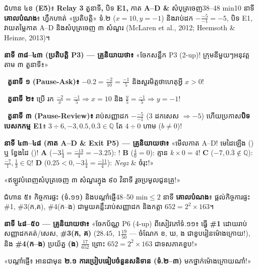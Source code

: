 \documentclass[a4paper,12pt]{article}
\newcommand{\en}[1]{{\TimesEn #1}}
\newcommand{\enbf}[1]{{\TimesEn\textbf{#1}}}
\newcommand{\enit}[1]{{\TimesEn\textit{#1}}}
\newcommand{\cnum}[1]{\mbox{\TimesEn\fontsize{10.5pt}{12pt}\selectfont\ding{\numexpr181+#1\relax}}\hspace{0.15em}}
\begin{document}
\begin{phasebox}{ជំហាន ៤ខ \enbf{(E5)}៖ \enbf{Relay 3} តួនាទី\enbf{,} បិទ \enbf{E1,} កាត \enbf{A–D \&} សំបុត្រចេញ}{38–48 min}{10 នាទី}
\textbf{គោលបំណង}៖ ហ្វឹកហាត់ «ប្រតិបត្តិ» ទំ.២ ($x=10, y=-1$) និងរាប់ដក $-\frac{-5}{-1}=-5$, បិទ \en{E1}, វាយតម្លៃកាត \en{A–D} និងសំបុត្រចេញ ៣ សំណួរ \en{(McLaren et al., 2012; Heemsoth \& Heinze, 2013)}។
\end{phasebox}
\begin{scriptbox}
  \textbf{នាទី ៣៨–៤៣ (ប្រតិបត្តិ \en{P3}) — គ្រូនិយាយថា៖} «ចែកសន្លឹក \en{P3 (2-up)}! ក្រុមនីមួយៗអនុវត្តតាម ៣ តួនាទី៖»\par\vspace{2pt}
  \textbullet\ \textbf{តួនាទី ១ (\en{Pause-Ask})៖} \en{[tracing]} $-0.2=\frac{-2}{10}=\frac{-1}{5}$ និងសួរមិត្តថាហេតុអ្វី $x > 0$!\par\vspace{2pt}
  \textbullet\ \textbf{តួនាទី ២៖} ប្រើ \cnum{4} រក $\frac{-2}{x}=\frac{-1}{5}\Rightarrow x=10$ និង $\frac{y}{5}=\frac{-1}{5}\Rightarrow y=-1$!\par\vspace{2pt}
  \textbullet\ \textbf{តួនាទី ៣ (\en{Pause-Review})៖} រាប់សញ្ញាដក $-\frac{-5}{-1}$ ($3$ ដកសេស $\Rightarrow -5$) ហើយប្រកាស\textbf{បិទបេសកកម្ម \en{E1}}៖ $3\div 6, -3, 0.5, 0.\overline{3} \in \mathbb{Q}$ តែ $4\div 0$ ហាម ($b\neq 0$)!\par\vspace{2pt}
  \textbf{នាទី ៤៣–៤៨ (កាត \en{A–D} \& \en{Exit P5}) — គ្រូនិយាយថា៖} «មើលកាត \en{A–D}! មេដៃឡើង () ឬ ខ្វែងដៃ ()! \textbf{A} ($-3\frac{1}{4}=\frac{-13}{4}=-3.25$): ! \textbf{B} ($\frac{4}{0}=0$):  គ្មាន $k\times 0=4$! \textbf{C} ($-7, 0.\overline{3}\notin\mathbb{Q}$):  $\frac{-7}{1}, \frac{1}{3}\in\mathbb{Q}$! \textbf{D} ($0.25<0, -3\frac{1}{4}=\frac{-11}{4}$):  \enit{Negz} \& ចំរុះ!»\par\vspace{2pt}
  «ឥឡូវបំពេញសំបុត្រចេញ ៣ សំណួរក្នុង ៩០ វិនាទី រួចប្រមូលជូនគ្រូ!»
\end{scriptbox}

\begin{phasebox}{ជំហាន ៥៖ កិច្ចការផ្ទះ \enbf{(}ទំ\enbf{.}១១\enbf{)} និងបណ្ដាំផ្ញើ}{48–50 min}{$\le 2$ នាទី}
\textbf{គោលបំណង}៖ ផ្ដល់កិច្ចការផ្ទះ \en{\#1, \#3}(ក,គ), \en{\#4}(ក\en{–}ង) ជាមួយគន្លឹះរាប់សញ្ញាដក និងកត្តា $652=2^2\times 163$។
\end{phasebox}
\begin{scriptbox}
  \textbf{នាទី ៤៨–៥០ — គ្រូនិយាយថា៖} «ចែកប័ណ្ណ \en{P6 (4-up)} ពីសៀវភៅទំ.១១៖ ធ្វើ \textbf{\#1} ដោយរាប់សញ្ញាដកគត់/សេស, \textbf{\#3(ក, គ)} ($28.45,\; 1\frac{19}{50}$ — ចំណែក ខ, ឃ, ង ជាខួបរៀនម៉ោងក្រោយ!), និង \textbf{\#4(ក–ង)} ប្រយ័ត្ន \textbf{(ង)} $\frac{17}{652}$ ព្រោះ $652=2^2\times 163$ ជាទសភាគខួប!»\par\vspace{2pt}
  «បណ្ដាំផ្ញើ៖ អានជាមុន \textbf{២.១ ការប្រៀបធៀបចំនួនសនិទាន (ទំ.២–៣)} មកថ្នាក់ម៉ោងក្រោយណា៎!»
\end{scriptbox}
\end{document}
